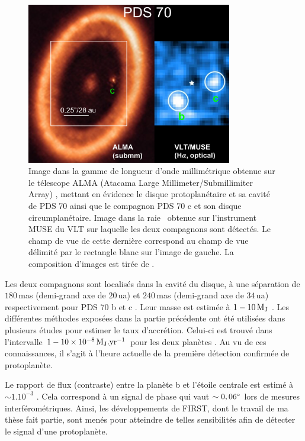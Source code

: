 \begin{figure}[ht!]
    \centering
    \includegraphics[width=0.8\textwidth]{Figure_Chap1/Currie2022_Figure7a.png}
    \caption[Images du système PDS 70.]{Image dans la gamme de longueur d'onde millimétrique obtenue sur le télescope ALMA (Atacama Large Millimeter/Submillimiter Array) \citep{benisty2021}, mettant en évidence le disque protoplanétaire et sa cavité de PDS 70 ainsi que le compagnon PDS 70 c et son disque circumplanétaire. Image dans la raie \ha~obtenue sur l'instrument MUSE du VLT \citep{haffert2019} sur laquelle les deux compagnons sont détectés. Le champ de vue de cette dernière correspond au champ de vue délimité par le rectangle blanc sur l'image de gauche. La composition d'images est tirée de \cite{currie2022a}.}
    \label{fig:PDS70Image}
\end{figure}

Les deux compagnons sont localisés dans la cavité du disque, à une séparation de $180 \,$mas (demi-grand axe de $20 \,$ua) et $240 \,$mas (demi-grand axe de $34 \,$ua) respectivement pour PDS 70 b et c \citep{wang2021}. Leur masse est estimée à $1 - 10 \, \text{$\text{M}_\text{J}$}$ \citep{wang2021, haffert2019}. Les différentes méthodes exposées dans la partie précédente ont été utilisées dans plusieurs études pour estimer le taux d'accrétion. Celui-ci est trouvé dans l'intervalle $1-10 \times 10^{-8} \, \text{$\text{M}_\text{J}$}.\text{yr}^{-1}$ pour les deux planètes \citep{wagner2018, haffert2019, aoyama2019, thanathibodee2019, hashimoto2020}. Au vu de ces connaissances, il s'agit à l'heure actuelle de la première détection confirmée de protoplanète.

Le rapport de flux (contraste) entre la planète b et l'étoile centrale est estimé à $\sim 1.10^{-3}$ \citep{wagner2018, zhou2021}. Cela correspond à un signal de phase qui vaut $\sim 0,06^{\circ}$ lors de mesures interférométriques. Ainsi, les développements de \ac{FIRST}, dont le travail de ma thèse fait partie, sont menés pour atteindre de telles sensibilités afin de détecter le signal d'une protoplanète.

